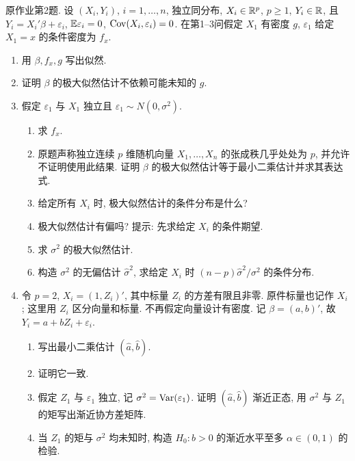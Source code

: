 \begin{exercise}\label{ps08:p02}
原作业第2题. 设 $(X_i,Y_i)$, $i=1,\ldots,n$, 独立同分布, $X_i\in\mathbb R^p$, $p\ge1$, $Y_i\in\mathbb R$, 且
$Y_i=X_i'\beta+\varepsilon_i$, $\mathbb E\varepsilon_i=0$, $\operatorname{Cov}(X_i,\varepsilon_i)=0$.
在第1--3问假定 $X_1$ 有密度 $g$, $\varepsilon_1$ 给定 $X_1=x$ 的条件密度为 $f_x$.
\begin{enumerate}[label=\arabic*.]
\item 用 $\beta,f_x,g$ 写出似然.
\item 证明 $\beta$ 的极大似然估计不依赖可能未知的 $g$.
\item 假定 $\varepsilon_1$ 与 $X_1$ 独立且 $\varepsilon_1\sim N(0,\sigma^2)$.
\begin{enumerate}[label=\alph*)]
\item 求 $f_x$.
\item 原题声称独立连续 $p$ 维随机向量 $X_1,\ldots,X_n$ 的张成秩几乎处处为 $p$, 并允许不证明使用此结果. 证明 $\beta$ 的极大似然估计等于最小二乘估计并求其表达式.
\item 给定所有 $X_i$ 时, 极大似然估计的条件分布是什么?
\item 极大似然估计有偏吗? 提示: 先求给定 $X_i$ 的条件期望.
\item 求 $\sigma^2$ 的极大似然估计.
\item 构造 $\sigma^2$ 的无偏估计 $\hat\sigma^2$, 求给定 $X_i$ 时 $(n-p)\hat\sigma^2/\sigma^2$ 的条件分布.
\end{enumerate}
\item 令 $p=2$, $X_i=(1,Z_i)'$, 其中标量 $Z_i$ 的方差有限且非零. 原件标量也记作 $X_i$; 这里用 $Z_i$ 区分向量和标量. 不再假定向量设计有密度. 记 $\beta=(a,b)'$, 故 $Y_i=a+bZ_i+\varepsilon_i$.
\begin{enumerate}[label=\alph*)]
\item 写出最小二乘估计 $(\hat a,\hat b)$.
\item 证明它一致.
\item 假定 $Z_1$ 与 $\varepsilon_1$ 独立, 记 $\sigma^2=\operatorname{Var}(\varepsilon_1)$. 证明 $(\hat a,\hat b)$ 渐近正态, 用 $\sigma^2$ 与 $Z_1$ 的矩写出渐近协方差矩阵.
\item 当 $Z_1$ 的矩与 $\sigma^2$ 均未知时, 构造 $H_0:b>0$ 的渐近水平至多 $\alpha\in(0,1)$ 的检验.
\end{enumerate}
\end{enumerate}
\end{exercise}

